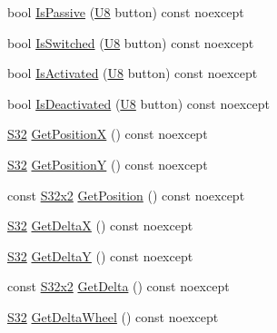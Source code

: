 \begin{DoxyCompactItemize}
\item 
bool \mbox{\hyperlink{classmage_1_1input_1_1_mouse_a32bcee1d744d90b06841ad5b77d6c17d}{Is\+Passive}} (\mbox{\hyperlink{namespacemage_a30677c03d683c4c35630c25f6ff3fb7f}{U8}} button) const noexcept
\item 
bool \mbox{\hyperlink{classmage_1_1input_1_1_mouse_af38182b04326b6885df7f7cdc09a44e6}{Is\+Switched}} (\mbox{\hyperlink{namespacemage_a30677c03d683c4c35630c25f6ff3fb7f}{U8}} button) const noexcept
\item 
bool \mbox{\hyperlink{classmage_1_1input_1_1_mouse_a00d4060759a1673e7b57b088b687531c}{Is\+Activated}} (\mbox{\hyperlink{namespacemage_a30677c03d683c4c35630c25f6ff3fb7f}{U8}} button) const noexcept
\item 
bool \mbox{\hyperlink{classmage_1_1input_1_1_mouse_afebf2a9e9cd25c6cb8ff7f203fbcab45}{Is\+Deactivated}} (\mbox{\hyperlink{namespacemage_a30677c03d683c4c35630c25f6ff3fb7f}{U8}} button) const noexcept
\item 
\mbox{\hyperlink{namespacemage_a2ef1a005a77358f1825d13fd481b557f}{S32}} \mbox{\hyperlink{classmage_1_1input_1_1_mouse_a208f26babea7ac6e07af5f79600e22ae}{Get\+PositionX}} () const noexcept
\item 
\mbox{\hyperlink{namespacemage_a2ef1a005a77358f1825d13fd481b557f}{S32}} \mbox{\hyperlink{classmage_1_1input_1_1_mouse_a81bf0ebd5fb34a25ba9f5d4c7aea1ed6}{Get\+PositionY}} () const noexcept
\item 
const \mbox{\hyperlink{namespacemage_aad06aca0b442d3b41653eafed822d571}{S32x2}} \mbox{\hyperlink{classmage_1_1input_1_1_mouse_a8127f78dd1fb1eba29c3888d40db97da}{Get\+Position}} () const noexcept
\item 
\mbox{\hyperlink{namespacemage_a2ef1a005a77358f1825d13fd481b557f}{S32}} \mbox{\hyperlink{classmage_1_1input_1_1_mouse_ac15719c468a94885a256e34b27cf2ca5}{Get\+DeltaX}} () const noexcept
\item 
\mbox{\hyperlink{namespacemage_a2ef1a005a77358f1825d13fd481b557f}{S32}} \mbox{\hyperlink{classmage_1_1input_1_1_mouse_a448886ed21c136f1a385101e21093aa3}{Get\+DeltaY}} () const noexcept
\item 
const \mbox{\hyperlink{namespacemage_aad06aca0b442d3b41653eafed822d571}{S32x2}} \mbox{\hyperlink{classmage_1_1input_1_1_mouse_a6f789e976d80c6f9c92388e3cf3502d6}{Get\+Delta}} () const noexcept
\item 
\mbox{\hyperlink{namespacemage_a2ef1a005a77358f1825d13fd481b557f}{S32}} \mbox{\hyperlink{classmage_1_1input_1_1_mouse_a71d088496a46d2915eb3fb8ba7dbb8e5}{Get\+Delta\+Wheel}} () const noexcept
\end{DoxyCompactItemize}
